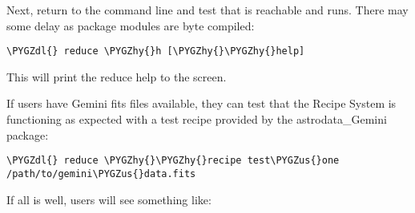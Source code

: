 \documentclass[letterpaper,10pt,english]{sphinxmanual}
\def\PYGZus{\char`\_}
\def\PYGZdl{\char`\$}
\def\PYGZhy{\char`\-}
\begin{document}
Next, return to the command line and test that  is reachable
and runs. There may some delay as package modules are byte compiled:

\begin{Verbatim}[commandchars=\\\{\}]
\PYGZdl{} reduce \PYGZhy{}h [\PYGZhy{}\PYGZhy{}help]
\end{Verbatim}

This will print the reduce help to the screen.

If users have Gemini fits files available, they can test that the Recipe System
is functioning as expected with a test recipe provided by the astrodata\_Gemini
package:

\begin{Verbatim}[commandchars=\\\{\}]
\PYGZdl{} reduce \PYGZhy{}\PYGZhy{}recipe test\PYGZus{}one /path/to/gemini\PYGZus{}data.fits
\end{Verbatim}

If all is well, users will see something like:
\end{document}
